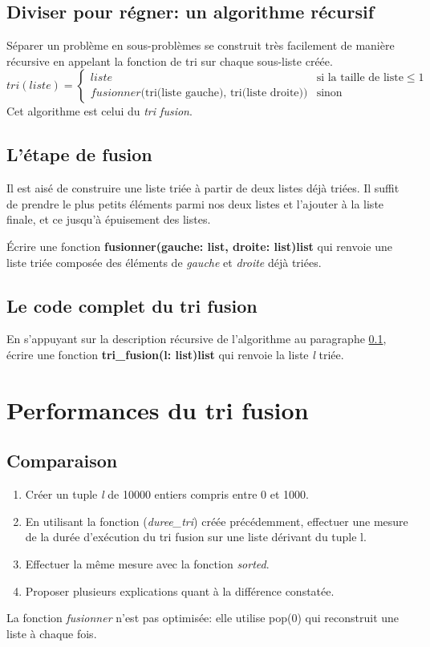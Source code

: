 \documentclass[a4paper,11pt]{article}
\begin{document}
\begin{Form}
\subsection{Diviser pour régner: un algorithme récursif}\label{algo}
Séparer un problème en sous-problèmes se construit très facilement de manière récursive en appelant la fonction de tri sur chaque sous-liste créée.
$$
tri(liste) = \left\{
    \begin{array}{ll}
        liste & \mbox{si la taille de liste} \leq 1 \\
        fusionner(\mbox{tri(liste gauche), tri(liste droite))} & \mbox{sinon }
    \end{array}
\right.
$$
Cet algorithme est celui du \emph{tri fusion}.
\subsection{L'étape de fusion}
Il est aisé de construire une liste triée à partir de deux listes déjà triées. Il suffit de prendre le plus petits éléments parmi nos deux listes et l'ajouter à la liste finale, et ce jusqu'à épuisement des listes.
\begin{activite}
Écrire une fonction \textbf{fusionner(gauche: list, droite: list)\;\rightarrow\;list} qui renvoie une liste triée composée des éléments de \emph{gauche} et \emph{droite} déjà triées.
\end{activite}
\subsection{Le code complet du tri fusion}
\begin{activite}
En s'appuyant sur la description récursive de l'algorithme au paragraphe \ref{algo}, écrire une fonction \textbf{tri\_fusion(l: list)\;\rightarrow\;list} qui renvoie la liste \emph{l} triée.
\end{activite}
\section{Performances du tri fusion}
\subsection{Comparaison}
\begin{activite}
\begin{enumerate}
\item Créer un tuple \emph{l} de 10000 entiers compris entre 0 et 1000.
\item En utilisant la fonction (\emph{duree\_tri}) créée précédemment, effectuer une mesure de la durée d'exécution du tri fusion sur une liste dérivant du tuple l.
\item Effectuer la même mesure avec la fonction \emph{sorted}.
\item Proposer plusieurs explications quant à la différence constatée.
\end{enumerate}
\end{activite}
\begin{commentprof}
La fonction \emph{fusionner} n'est pas optimisée: elle utilise pop(0) qui reconstruit une liste à chaque fois.
\end{commentprof}

\end{Form}
\end{document}
